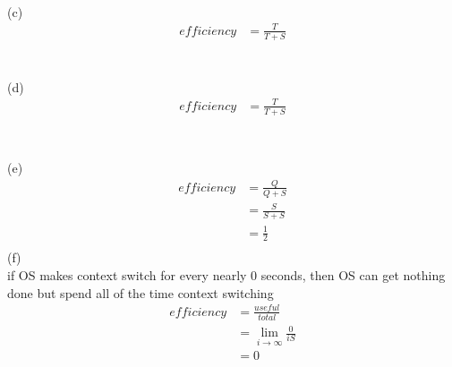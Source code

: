 \documentclass[12pt, border = 4pt, multi]{article} %
\begin{document}
\\
(c)\\
\begin{align*}
efficiency &= \frac{T}{T + S}
\end{align*}
\\
\\
(d)
\begin{align*}
efficiency &= \frac{T}{T + S}\\
\end{align*}
\\
\\
(e)
\begin{align*}
efficiency &= \frac{Q}{Q + S}\\
&= \frac{S}{S + S}\\
&= \frac{1}{2}\\
\end{align*}
(f)\\
if OS makes context switch for every nearly 0 seconds, then OS can get nothing done but spend all of the time context switching 
\begin{align*}
efficiency &= \frac{useful}{total}\\
&= \lim_{i \rightarrow \infty}\frac{0}{iS}\\
&= 0
\end{align*}
\end{document}
